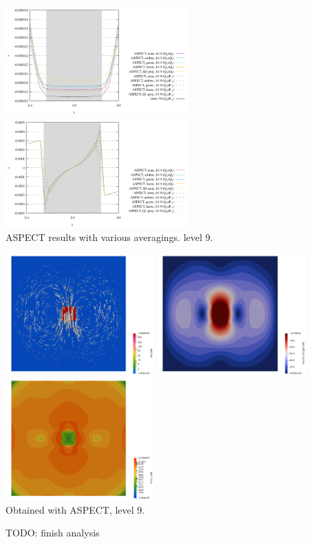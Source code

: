 \begin{center}
\includegraphics[width=7cm]{images/sinking_block/v_NS_ASPECT_avrg}
\includegraphics[width=7cm]{images/sinking_block/pressure_NS_ASPECT_avrg}\\
{\captionfont ASPECT results with various averagings. level 9.}
\end{center}


\begin{center}
\includegraphics[width=5.7cm]{images/sinking_block/NS/ASPECT/q2q1/eta}
\includegraphics[width=5.7cm]{images/sinking_block/NS/ASPECT/q2q1/vel}
\includegraphics[width=5.7cm]{images/sinking_block/NS/ASPECT/q2q1/sr}\\
{\captionfont Obtained with ASPECT, level 9.}
\end{center}

TODO: finish analysis








